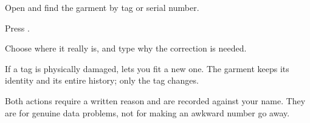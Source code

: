\begin{steps}
  \item Open  and find the garment by tag or serial number.
  \item Press .
  \item Choose where it really is, and type why the correction is needed.
\end{steps}


If a tag is physically damaged,  lets you fit a new one.
The garment keeps its identity and its entire history; only the tag changes.

\begin{warnbox}
Both actions require a written reason and are recorded against your name. They
are for genuine data problems, not for making an awkward number go away.
\end{warnbox}
